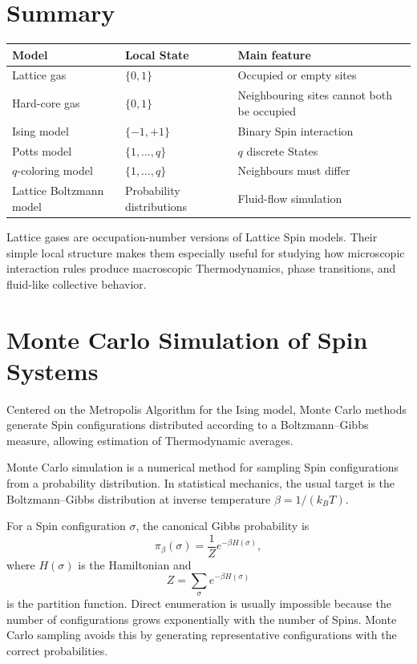 \documentclass[a4paper, 10pt, onepage]{elegantbook}
\begin{document}
{\section*{Summary}

\begin{center}
\begin{tabular}{lll}
\hline
Model & Local State & Main feature \\
\hline
Lattice gas & \(\{0,1\}\) & Occupied or empty sites \\
Hard-core gas & \(\{0,1\}\) & Neighbouring sites cannot both be occupied \\
Ising model & \(\{-1,+1\}\) & Binary Spin interaction \\
Potts model & \(\{1,\ldots,q\}\) & \(q\) discrete States \\
\(q\)-coloring model & \(\{1,\ldots,q\}\) & Neighbours must differ \\
Lattice Boltzmann model & Probability distributions & Fluid-flow simulation \\
\hline
\end{tabular}
\end{center}

Lattice gases are occupation-number versions of Lattice Spin models. Their
simple local structure makes them especially useful for studying how microscopic
interaction rules produce macroscopic Thermodynamics, phase transitions, and
fluid-like collective behavior.

\newpage



\section{Monte Carlo Simulation of Spin Systems}


Centered on the Metropolis Algorithm for the Ising model,
 Monte Carlo methods generate Spin configurations distributed according to a Boltzmann--Gibbs measure, allowing 
estimation of Thermodynamic averages.

Monte Carlo simulation is a numerical method for sampling Spin configurations
from a probability distribution. In statistical mechanics, the usual target is
the Boltzmann--Gibbs distribution at inverse temperature
\(\beta=1/(k_BT)\).

For a Spin configuration \(\sigma\), the canonical Gibbs probability is
\[
\pi_\beta(\sigma)
=
\frac{1}{Z}
e^{-\beta H(\sigma)},
\]
where \(H(\sigma)\) is the Hamiltonian and
\[
Z=\sum_\sigma e^{-\beta H(\sigma)}
\]
is the partition function. Direct enumeration is usually impossible because the
number of configurations grows exponentially with the number of Spins.
Monte Carlo sampling avoids this by generating representative configurations
with the correct probabilities. 

}
\end{document}
